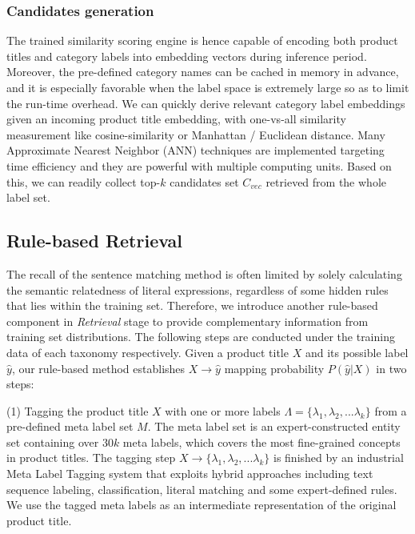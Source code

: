 \subsubsection{Candidates generation}
The trained similarity scoring engine is hence capable of encoding both product titles and category labels into embedding vectors during inference period. Moreover, the pre-defined category names 
can be cached in memory in advance, and it is especially favorable when the label space is extremely large so as to limit the run-time overhead. We can quickly derive relevant category label embeddings given an incoming product title embedding, with one-vs-all similarity measurement like cosine-similarity or Manhattan / Euclidean distance. Many Approximate Nearest Neighbor (ANN) techniques are implemented targeting time efficiency and they are powerful with multiple computing units. Based on this, we can readily 
collect top-$k$ candidates set $C_{vec}$ retrieved from the whole label set.
\subsection{Rule-based Retrieval}
The recall of the sentence matching method is often limited by solely calculating the semantic relatedness of literal expressions, regardless of some hidden rules that lies within the training set. 
Therefore, we introduce another rule-based component in \textit{Retrieval} stage to provide complementary information from training set distributions. 
The following steps are conducted under the training data of each taxonomy respectively.
Given a product title $X$ and its possible label $\hat{y}$, our rule-based method establishes $X \rightarrow \hat{y}$ mapping probability $P(\hat{y} | X)$ in two steps: 

(1) Tagging the product title $X$ with one or more labels $\Lambda=\{\lambda_1, \lambda_2, ... \lambda_k\}$ from a pre-defined meta label set $M$.
The meta label set is an expert-constructed entity set containing over $30k$ meta labels, which covers the most fine-grained concepts in product titles. The tagging step $X \rightarrow \{\lambda_1, \lambda_2, ... \lambda_k\}$ is finished by an industrial Meta Label Tagging system that exploits hybrid approaches including text sequence labeling, classification, literal matching and some expert-defined rules. We use the tagged meta labels as an intermediate representation of the original product title.


